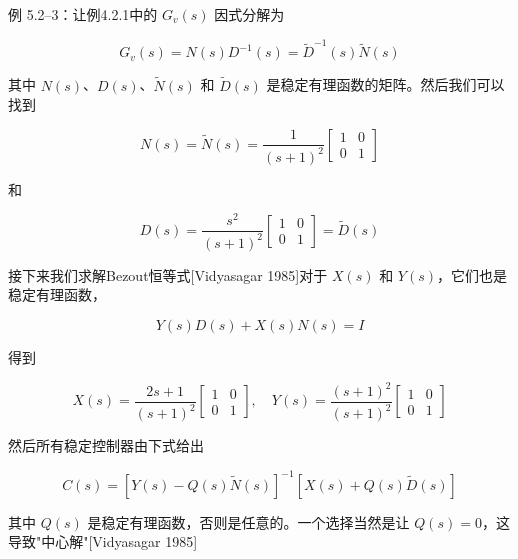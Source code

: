 \documentclass[UTF8,12pt,a4paper]{ctexart}
\begin{document}
\begin{example}
例 5.2--3：让例4.2.1中的 $G_v(s)$ 因式分解为

\begin{equation}
G_v(s) = N(s)D^{-1}(s) = \tilde{D}^{-1}(s)\tilde{N}(s)
\end{equation}

其中 $N(s)$、$D(s)$、$\tilde{N}(s)$ 和 $\tilde{D}(s)$ 是稳定有理函数的矩阵。然后我们可以找到

\begin{equation}
N(s) = \tilde{N}(s) = \frac{1}{(s+1)^2}\begin{bmatrix} 1 & 0 \\ 0 & 1 \end{bmatrix}
\end{equation}

和

\begin{equation}
D(s) = \frac{s^2}{(s+1)^2}\begin{bmatrix} 1 & 0 \\ 0 & 1 \end{bmatrix} = \tilde{D}(s)
\end{equation}

接下来我们求解Bezout恒等式[Vidyasagar 1985]对于 $X(s)$ 和 $Y(s)$，它们也是稳定有理函数，

\begin{equation}
Y(s)D(s) + X(s)N(s) = I
\end{equation}

得到

\begin{equation}
X(s) = \frac{2s+1}{(s+1)^2}\begin{bmatrix} 1 & 0 \\ 0 & 1 \end{bmatrix}, \quad Y(s) = \frac{(s+1)^2}{(s+1)^2}\begin{bmatrix} 1 & 0 \\ 0 & 1 \end{bmatrix}
\end{equation}

然后所有稳定控制器由下式给出

\begin{equation}
C(s) = [Y(s) - Q(s)\tilde{N}(s)]^{-1}[X(s) + Q(s)\tilde{D}(s)]
\end{equation}

其中 $Q(s)$ 是稳定有理函数，否则是任意的。一个选择当然是让 $Q(s) = 0$，这导致"中心解"[Vidyasagar 1985]


\end{example}
\end{document}
